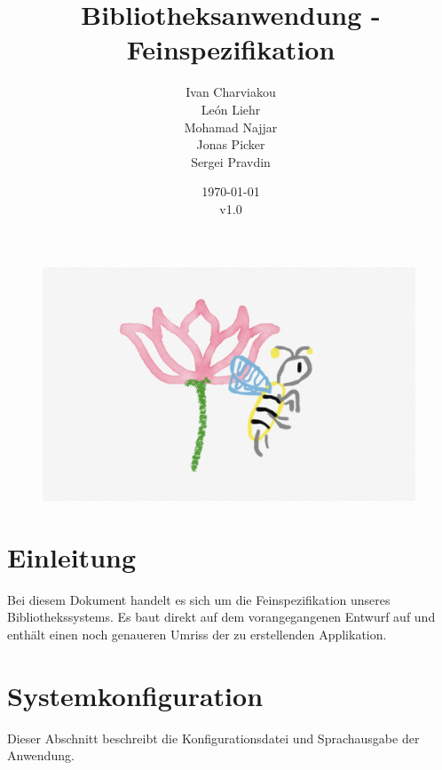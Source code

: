 \documentclass{article}
\title{Bibliotheksanwendung - Feinspezifikation}
\date{\today\\v1.0}
\author{
	Ivan Charviakou\\
	León Liehr\\
	Mohamad Najjar\\
	Jonas Picker\\
	Sergei Pravdin
}
\begin{document}
\maketitle
\begin{figure}[H]
	\centering
	\includegraphics[width = 30em]{Logo}
\end{figure}
\newpage
\tableofcontents
\newpage

\section{Einleitung}
Bei diesem Dokument handelt es sich um die Feinspezifikation unseres Bibliothekssystems. Es baut direkt auf dem vorangegangenen Entwurf auf und enthält einen noch genaueren Umriss der zu erstellenden Applikation.







\section{Systemkonfiguration}
Dieser Abschnitt beschreibt die Konfigurationsdatei und Sprachausgabe der Anwendung.
\end{document}

